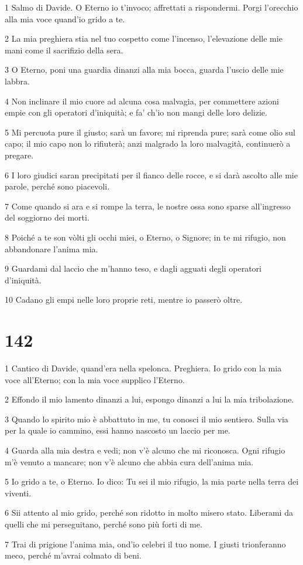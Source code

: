 \par 1 Salmo di Davide. O Eterno io t'invoco; affrettati a rispondermi. Porgi l'orecchio alla mia voce quand'io grido a te.
\par 2 La mia preghiera stia nel tuo cospetto come l'incenso, l'elevazione delle mie mani come il sacrifizio della sera.
\par 3 O Eterno, poni una guardia dinanzi alla mia bocca, guarda l'uscio delle mie labbra.
\par 4 Non inclinare il mio cuore ad alcuna cosa malvagia, per commettere azioni empie con gli operatori d'iniquità; e fa' ch'io non mangi delle loro delizie.
\par 5 Mi percuota pure il giusto; sarà un favore; mi riprenda pure; sarà come olio sul capo; il mio capo non lo rifiuterà; anzi malgrado la loro malvagità, continuerò a pregare.
\par 6 I loro giudici saran precipitati per il fianco delle rocce, e si darà ascolto alle mie parole, perché sono piacevoli.
\par 7 Come quando si ara e si rompe la terra, le nostre ossa sono sparse all'ingresso del soggiorno dei morti.
\par 8 Poiché a te son vòlti gli occhi miei, o Eterno, o Signore; in te mi rifugio, non abbandonare l'anima mia.
\par 9 Guardami dal laccio che m'hanno teso, e dagli agguati degli operatori d'iniquità.
\par 10 Cadano gli empi nelle loro proprie reti, mentre io passerò oltre.

\chapter{142}

\par 1 Cantico di Davide, quand'era nella spelonca. Preghiera. Io grido con la mia voce all'Eterno; con la mia voce supplico l'Eterno.
\par 2 Effondo il mio lamento dinanzi a lui, espongo dinanzi a lui la mia tribolazione.
\par 3 Quando lo spirito mio è abbattuto in me, tu conosci il mio sentiero. Sulla via per la quale io cammino, essi hanno nascosto un laccio per me.
\par 4 Guarda alla mia destra e vedi; non v'è alcuno che mi riconosca. Ogni rifugio m'è venuto a mancare; non v'è alcuno che abbia cura dell'anima mia.
\par 5 Io grido a te, o Eterno. Io dico: Tu sei il mio rifugio, la mia parte nella terra dei viventi.
\par 6 Sii attento al mio grido, perché son ridotto in molto misero stato. Liberami da quelli che mi perseguitano, perché sono più forti di me.
\par 7 Trai di prigione l'anima mia, ond'io celebri il tuo nome. I giusti trionferanno meco, perché m'avrai colmato di beni.

